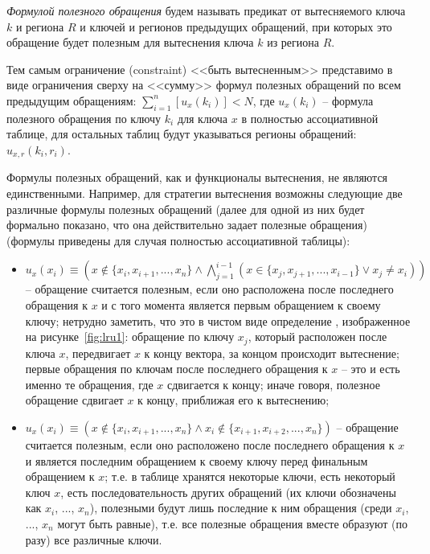\emph{Формулой полезного обращения} будем называть предикат от вытесняемого ключа $k$ и региона $R$ и ключей и регионов предыдущих обращений, при которых это обращение будет полезным для вытеснения ключа $k$ из региона $R$.

Тем самым ограничение (constraint) <<быть вытесненным>> представимо в виде
ограничения сверху на <<сумму>> формул полезных обращений по всем предыдущим обращениям: $\sum_{i=1}^n [u_x(k_i)] < N$, где $u_x(k_i)$ -- формула полезного обращения по ключу $k_i$ для ключа $x$ в полностью ассоциативной таблице, для остальных таблиц будут указываться регионы обращений: $u_{x,r}(k_i, r_i)$.

Формулы полезных обращений, как и функционалы вытеснения, не являются единственными. Например, для стратегии вытеснения \LRU возможны следующие две различные формулы полезных обращений (далее для одной из них будет формально показано, что она действительно задает полезные обращения) (формулы приведены для случая полностью ассоциативной таблицы):
\begin{itemize}
  \item $u_x(x_i) \equiv (x \notin \{x_i, x_{i+1}, ..., x_n\} \wedge
\bigwedge\limits_{j=1}^{i-1} (x \in \{x_j, x_{j+1}, ..., x_{i-1}\} \vee x_j
\neq x_i))$ -- обращение считается полезным, если оно расположена после
последнего обращения к $x$ и с того момента является первым обращением к своему
ключу; нетрудно заметить, что это в чистом виде определение \LRU, изображенное на рисунке~\ref{fig:lru1}: обращение по ключу $x_j$, который расположен после ключа $x$, передвигает $x$ к концу вектора, за концом происходит вытеснение; первые обращения по ключам после последнего обращения к $x$ -- это и есть именно те обращения, где $x$ сдвигается к концу; иначе говоря, полезное обращение сдвигает $x$ к концу, приближая его к вытеснению;
  \item $u_x(x_i) \equiv (x \notin \{x_i, x_{i+1}, ..., x_n\} \wedge x_i \notin
\{x_{i+1}, x_{i+2}, ..., x_n\})$ -- обращение считается полезным, если оно
расположено после последнего обращения к $x$ и является последним обращением к
своему ключу перед финальным обращением к $x$; т.е. в таблице хранятся некоторые ключи, есть некоторый ключ $x$, есть последовательность других обращений (их
ключи обозначены как  $x_i$, ..., $x_n$), полезными будут лишь последние к ним обращения (среди $x_i$, ..., $x_n$ могут быть равные), т.е. все полезные обращения вместе образуют (по разу) все различные ключи.
\end{itemize}

